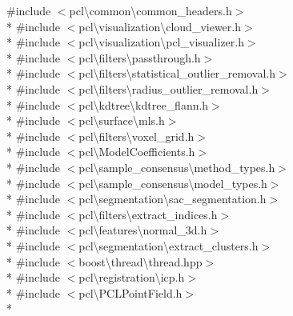 {\ttfamily \#include $<$pcl\textbackslash{}common\textbackslash{}common\-\_\-headers.\-h$>$}\\*
{\ttfamily \#include $<$pcl\textbackslash{}visualization\textbackslash{}cloud\-\_\-viewer.\-h$>$}\\*
{\ttfamily \#include $<$pcl\textbackslash{}visualization\textbackslash{}pcl\-\_\-visualizer.\-h$>$}\\*
{\ttfamily \#include $<$pcl\textbackslash{}filters\textbackslash{}passthrough.\-h$>$}\\*
{\ttfamily \#include $<$pcl\textbackslash{}filters\textbackslash{}statistical\-\_\-outlier\-\_\-removal.\-h$>$}\\*
{\ttfamily \#include $<$pcl\textbackslash{}filters\textbackslash{}radius\-\_\-outlier\-\_\-removal.\-h$>$}\\*
{\ttfamily \#include $<$pcl\textbackslash{}kdtree\textbackslash{}kdtree\-\_\-flann.\-h$>$}\\*
{\ttfamily \#include $<$pcl\textbackslash{}surface\textbackslash{}mls.\-h$>$}\\*
{\ttfamily \#include $<$pcl\textbackslash{}filters\textbackslash{}voxel\-\_\-grid.\-h$>$}\\*
{\ttfamily \#include $<$pcl\textbackslash{}\-Model\-Coefficients.\-h$>$}\\*
{\ttfamily \#include $<$pcl\textbackslash{}sample\-\_\-consensus\textbackslash{}method\-\_\-types.\-h$>$}\\*
{\ttfamily \#include $<$pcl\textbackslash{}sample\-\_\-consensus\textbackslash{}model\-\_\-types.\-h$>$}\\*
{\ttfamily \#include $<$pcl\textbackslash{}segmentation\textbackslash{}sac\-\_\-segmentation.\-h$>$}\\*
{\ttfamily \#include $<$pcl\textbackslash{}filters\textbackslash{}extract\-\_\-indices.\-h$>$}\\*
{\ttfamily \#include $<$pcl\textbackslash{}features\textbackslash{}normal\-\_\-3d.\-h$>$}\\*
{\ttfamily \#include $<$pcl\textbackslash{}segmentation\textbackslash{}extract\-\_\-clusters.\-h$>$}\\*
{\ttfamily \#include $<$boost\textbackslash{}thread\textbackslash{}thread.\-hpp$>$}\\*
{\ttfamily \#include $<$pcl\textbackslash{}registration\textbackslash{}icp.\-h$>$}\\*
{\ttfamily \#include $<$pcl\textbackslash{}\-P\-C\-L\-Point\-Field.\-h$>$}\\*
